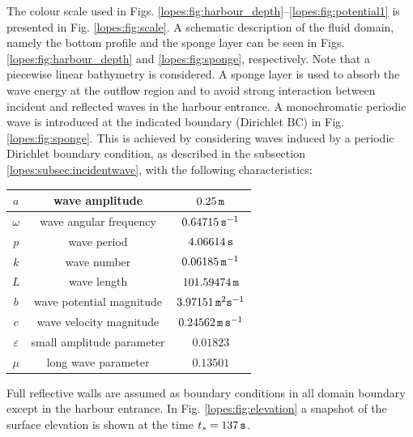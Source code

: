The colour scale used in Figs. \ref{lopes:fig:harbour_depth}--\ref{lopes:fig:potential1}  is presented in
Fig. \ref{lopes:fig:scale}.
A schematic description of the fluid domain, namely the bottom profile and the
sponge layer can be seen in Figs. \ref{lopes:fig:harbour_depth}
and \ref{lopes:fig:sponge}, respectively.
Note that a piecewise linear bathymetry  is considered.
A sponge layer is used to absorb the wave energy at the
outflow region
and to avoid strong  interaction between incident and
reflected waves  in the harbour entrance.
 A monochromatic periodic wave
is introduced at the indicated boundary (Dirichlet BC) in
Fig. \ref{lopes:fig:sponge}.
This is achieved by considering waves induced by
a periodic Dirichlet boundary condition, as
described in the subsection \ref{lopes:subsec:incidentwave},
with the following characteristics:
\begin{center}
\renewcommand{\arraystretch}{1.3}
\begin{tabular}{|c|c|c|}
\hline
\(a\)       &   wave  amplitude &     \(0.25 \,{\tt m}\)\\ \hline
\(\omega\)  &   wave angular frequency       &   \(0.64715 \,{\tt s}^{-1}\)\\ \hline
\(p\)       &   wave  period  &       \(4.06614 \,{\tt s}\)\\ \hline
\(k\)       &   wave number &   \(0.06185 \,{\tt m}^{-1}\)\\ \hline
\(L\)       &   wave length &       \(101.59474 \,{\tt m}\)\\ \hline
\(b\)       &   wave potential magnitude&   \(3.97151 \,{\tt m}^2{\tt s}^{-1}\)\\ \hline
\(c\)       &   wave velocity  magnitude&  \(0.24562 \,{\tt m\, s}^{-1}\) \\ \hline
\(\varepsilon\)&   small amplitude parameter & \(0.01823\)\\ \hline
\(\mu\)     &   long wave parameter &       \(0.13501\)\\ \hline
\end{tabular}
\end{center}
Full reflective walls are assumed as boundary conditions in
all domain boundary except in the harbour entrance.
In Fig. \ref{lopes:fig:elevation}
a snapshot of the surface elevation  is shown at the time
 \(t_s=137\,{\tt s}\).

